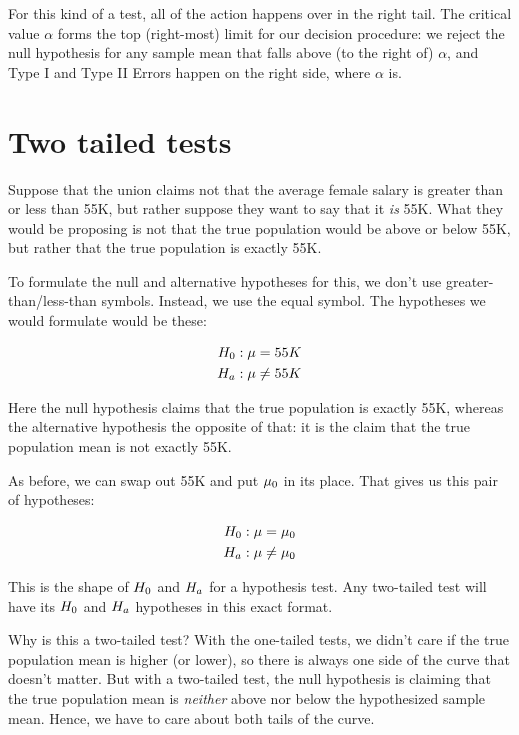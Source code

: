 \documentclass[../../../main.tex]{subfiles}
\begin{document}
\noindent
For this kind of a test, all of the action happens over in the right tail. The critical value $\alpha$ forms the top (right-most) limit for our decision procedure: we reject the null hypothesis for any sample mean that falls above (to the right of) $\alpha$, and Type I and Type II Errors happen on the right side, where $\alpha$ is.



\section{Two tailed tests}

Suppose that the union claims not that the average female salary is greater than or less than 55K, but rather suppose they want to say that it \emph{is} 55K. What they would be proposing is not that the true population would be above or below 55K, but rather that the true population is exactly 55K.

To formulate the null and alternative hypotheses for this, we don't use greater-than/less-than symbols. Instead, we use the equal symbol. The hypotheses we would formulate would be these:

\begin{align*}
  \NullHyp/: \populationmean = 55K \\
  \AltHyp/: \populationmean \not = 55K
\end{align*}

\noindent
Here the null hypothesis claims that the true population is exactly 55K, whereas the alternative hypothesis the opposite of that: it is the claim that the true population mean is not exactly 55K.

As before, we can swap out 55K and put $\HypPopMean/$ in its place. That gives us this pair of hypotheses:

\begin{align*}
  \NullHyp/: \populationmean = \HypPopMean/ \\
  \AltHyp/: \populationmean \not = \HypPopMean/
\end{align*}

\noindent
This is the shape of $\NullHyp/$ and $\AltHyp/$ for a  hypothesis test. Any two-tailed test will have its $\NullHyp/$ and $\AltHyp/$ hypotheses in this exact format.

Why is this a two-tailed test? With the one-tailed tests, we didn't care if the true population mean is higher (or lower), so there is always one side of the curve that doesn't matter. But with a two-tailed test, the null hypothesis is claiming that the true population mean is \emph{neither} above nor below the hypothesized sample mean. Hence, we have to care about both tails of the curve.
\end{document}
